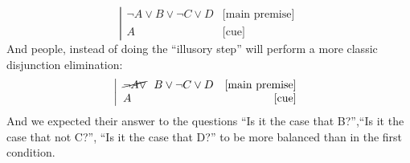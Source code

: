 \documentclass[]{article}
\begin{document}
\begin{equation}
\left |\begin{array}{lr}
\neg A \vee B \vee \neg C \vee D & \mbox{[main premise]} \\
A & \mbox{[cue]}
\end{array} \right .
\end{equation}
And people, instead of doing the ``illusory step'' will perform a more classic disjunction elimination:
\begin{equation}\left |
\begin{array}{lr}
\cancel{\neg A \vee} \ \ B \vee \neg C \vee D & \mbox{[main premise]} \\
A & \mbox{[cue]}
\end{array} \right .
\end{equation}
And we expected their answer to the questions ``Is it the case that B?'',``Is it the case that not C?'', ``Is it the case that D?'' to be more balanced than in the first condition.
\end{document}
